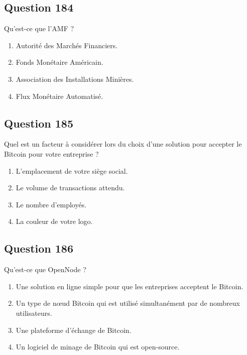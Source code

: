 \documentclass[12pt,a4paper]{article}
\begin{document}
\bigskip


\subsection*{Question 184}
Qu'est-ce que l'AMF ?

\begin{enumerate}[label=\Alph*., leftmargin=*]
\item Autorité des Marchés Financiers.
\item Fonds Monétaire Américain.
\item Association des Installations Minières.
\item Flux Monétaire Automatisé.
\end{enumerate}

\bigskip


\subsection*{Question 185}
Quel est un facteur à considérer lors du choix d'une solution pour accepter le Bitcoin pour votre entreprise ?

\begin{enumerate}[label=\Alph*., leftmargin=*]
\item L'emplacement de votre siège social.
\item Le volume de transactions attendu.
\item Le nombre d'employés.
\item La couleur de votre logo.
\end{enumerate}

\bigskip


\subsection*{Question 186}
Qu'est-ce que OpenNode ?

\begin{enumerate}[label=\Alph*., leftmargin=*]
\item Une solution en ligne simple pour que les entreprises acceptent le Bitcoin.
\item Un type de nœud Bitcoin qui est utilisé simultanément par de nombreux utilisateurs.
\item Une plateforme d'échange de Bitcoin.
\item Un logiciel de minage de Bitcoin qui est open-source.
\end{enumerate}

\bigskip
\end{document}
